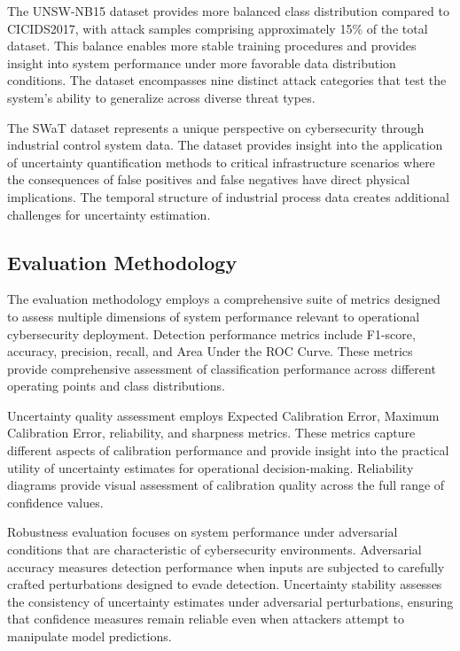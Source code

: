 \documentclass[journal]{IEEEtran}
\begin{document}
The UNSW-NB15 dataset provides more balanced class distribution compared to CICIDS2017, with attack samples comprising approximately 15\% of the total dataset. This balance enables more stable training procedures and provides insight into system performance under more favorable data distribution conditions. The dataset encompasses nine distinct attack categories that test the system's ability to generalize across diverse threat types.

The SWaT dataset represents a unique perspective on cybersecurity through industrial control system data. The dataset provides insight into the application of uncertainty quantification methods to critical infrastructure scenarios where the consequences of false positives and false negatives have direct physical implications. The temporal structure of industrial process data creates additional challenges for uncertainty estimation.

\subsection{Evaluation Methodology}

The evaluation methodology employs a comprehensive suite of metrics designed to assess multiple dimensions of system performance relevant to operational cybersecurity deployment. Detection performance metrics include F1-score, accuracy, precision, recall, and Area Under the ROC Curve. These metrics provide comprehensive assessment of classification performance across different operating points and class distributions.

Uncertainty quality assessment employs Expected Calibration Error, Maximum Calibration Error, reliability, and sharpness metrics. These metrics capture different aspects of calibration performance and provide insight into the practical utility of uncertainty estimates for operational decision-making. Reliability diagrams provide visual assessment of calibration quality across the full range of confidence values.

Robustness evaluation focuses on system performance under adversarial conditions that are characteristic of cybersecurity environments. Adversarial accuracy measures detection performance when inputs are subjected to carefully crafted perturbations designed to evade detection. Uncertainty stability assesses the consistency of uncertainty estimates under adversarial perturbations, ensuring that confidence measures remain reliable even when attackers attempt to manipulate model predictions.
\end{document}
